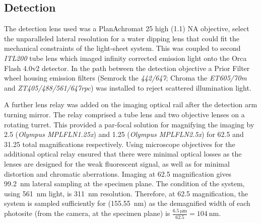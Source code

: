 
\subsection{Detection}

The detection lens used was a PlanAchromat \SI{25}{\times} high (\SI{1.1}{}) \gls{NA} objective, select the unparalleled lateral resolution for a water dipping lens that could fit the mechanical constraints of the \gls{light-sheet} system.
This was coupled to second \emph{ITL200} tube lens which imaged infinity corrected emission light onto the Orca Flash 4.0v2 detector.
In the path between the detection objective a Prior Filter wheel housing emission filters (Semrock the \emph{442/647};
Chroma the \emph{ET605/70m} and \emph{ZT405/488/561/647rpc}) was installed to reject scattered illumination light.

A further lens relay was added on the \gls{imaging optical rail} after the \gls{detection arm} turning mirror.
The relay comprised a tube lens and two objective lenses on a rotating turret.
This provided a par-focal solution for magnifying the imaging by \SI{2.5}{\times} (\emph{Olympus MPLFLN1.25x}) and \SI{1.25}{\times} (\emph{Olympus MPLFLN2.5x}) for \SI{62.5}{\times} and \SI{31.25}{\times} total magnifications respectively.
Using microscope objectives for the additional optical relay ensured that there were minimal optical losses as the lenses are designed for the weak fluorescent signal, as well as for minimal distortion and chromatic aberrations.
Imaging at \SI{62.5}{\times} magnification gives \SI{99.2}{\nano\meter} lateral sampling at the specimen plane.
The  condition of the system, using \SI{561}{\nano\meter} light, is \SI{311}{\nano\meter} resolution.
Therefore, at \SI{62.5}{\times} magnification, the system is sampled sufficiently for  (\SI{155.55}{\nano\meter})
as the demagnified width of each \gls{photosite} (from the camera, at the specimen plane) is \(\frac{\SI{6.5}{\micro\meter}}{62.5}=\SI{104}{\nano\meter}\).

